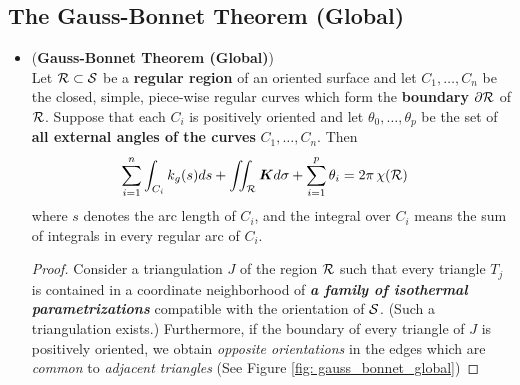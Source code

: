 \documentclass[11pt]{article}
\begin{document}
\subsection{The Gauss-Bonnet Theorem (Global)}
\begin{itemize}
\item 
\begin{theorem}\label{thm: gauss_bonnet_global} (\textbf{Gauss-Bonnet Theorem (Global)}) \citep{do1976differential}\\
Let ${\mathcal R} \subset {\mathcal S}$  be a \textbf{regular region} of an oriented surface and let $C_1,\ldots, C_n$ be the closed, simple, piece-wise regular curves which form the \textbf{boundary} $\partial {\mathcal R}$ of ${\mathcal R}$. Suppose that each $C_i$ is positively oriented and let $\theta_0,\ldots,\theta_p$ be the set of \textbf{all external angles of the curves} $C_1,\ldots, C_n$. Then
\begin{align}
\sum_{i=1}^{n}\int_{C_{i}}k_{g}(s)ds + \iint_{{\mathcal R}}\boldsymbol{K}d\sigma + \sum_{i=1}^{p}\theta_{i} &= 2\pi \,\chi({\mathcal R}) \label{eqn: gauss_bonnet_global}
\end{align} where $s$ denotes the arc length of $C_i$, and the integral over $C_i$ means the sum of integrals in every regular arc of $C_i$.
\end{theorem}

\begin{proof}
Consider a triangulation $J$ of the region ${\mathcal R}$ such that every triangle $T_j$ is contained in a coordinate neighborhood of \emph{\textbf{a family of isothermal parametrizations}} compatible with the orientation of ${\mathcal S}$. (Such a triangulation exists.) Furthermore, if the boundary of every triangle of $J$ is positively oriented, we obtain \emph{opposite orientations} in the edges which are \emph{common} to \emph{adjacent triangles} (See Figure \ref{fig: gauss_bonnet_global})


\end{proof}
\end{itemize}
\end{document}
